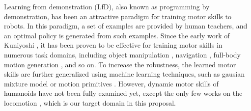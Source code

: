 Learning from demonstration (LfD), also known as programming by demonstration,
has been an attractive paradigm for training motor skills to robots.
In this paradigm, a set of examples are provided by human teachers,
and an optimal policy is generated from such examples.
Since the early work of Kuniyoshi \etal \cite{kuniyoshi:1989:TBS},
it has been proven to be effective for training motor skills in
numerous task domains, including object manipulation 
\cite{Atkeson:1997:RLD,Calinon:2007:LRG,Ueda:2010:MNH},
navigation \cite{Konidaris:2011:RLD}, 
full-body motion generation \cite{Kulic:2011:ILF}, and so on.
To increase the robustness, the learned motor skills are further 
generalized using machine learning techniques,
such as gausian mixture model \cite{Calinon:2007:LRG} or
motion primitives \cite{Pastor:2009:LGM}.
However, dynamic motor skills of humanoids have
not been fully examined yet, except the only few works on the
locomotion \cite{Nakanishi:2004:LDA}, which is our target domain
in this proposal.



